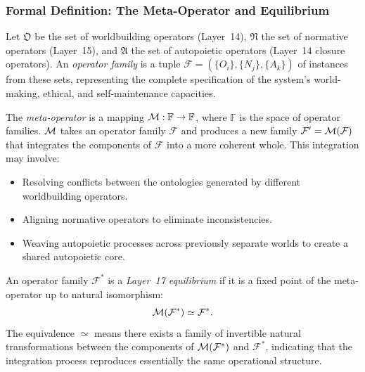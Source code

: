 \subsubsection{Formal Definition: The Meta-Operator and Equilibrium}
\begin{definition}
Let $\mathfrak{O}$ be the set of worldbuilding operators (Layer~14), $\mathfrak{N}$ the set of normative operators (Layer~15), and $\mathfrak{A}$ the set of autopoietic operators (Layer~14 closure operators). An \emph{operator family} is a tuple $\mathcal{F} = (\{O_i\}, \{N_j\}, \{A_k\})$ of instances from these sets, representing the complete specification of the system's world-making, ethical, and self-maintenance capacities.
\end{definition}

\begin{definition}
The \emph{meta-operator} is a mapping $\mathcal{M}: \mathbb{F} \to \mathbb{F}$, where $\mathbb{F}$ is the space of operator families. $\mathcal{M}$ takes an operator family $\mathcal{F}$ and produces a new family $\mathcal{F}' = \mathcal{M}(\mathcal{F})$ that integrates the components of $\mathcal{F}$ into a more coherent whole. This integration may involve:
\begin{itemize}
    \item Resolving conflicts between the ontologies generated by different worldbuilding operators.
    \item Aligning normative operators to eliminate inconsistencies.
    \item Weaving autopoietic processes across previously separate worlds to create a shared autopoietic core.
\end{itemize}
\end{definition}

\begin{definition}
An operator family $\mathcal{F}^*$ is a \emph{Layer~17 equilibrium} if it is a fixed point of the meta-operator up to natural isomorphism:
\[
\mathcal{M}(\mathcal{F}^*) \simeq \mathcal{F}^*.
\]
The equivalence $\simeq$ means there exists a family of invertible natural transformations between the components of $\mathcal{M}(\mathcal{F}^*)$ and $\mathcal{F}^*$, indicating that the integration process reproduces essentially the same operational structure.
\end{definition}

